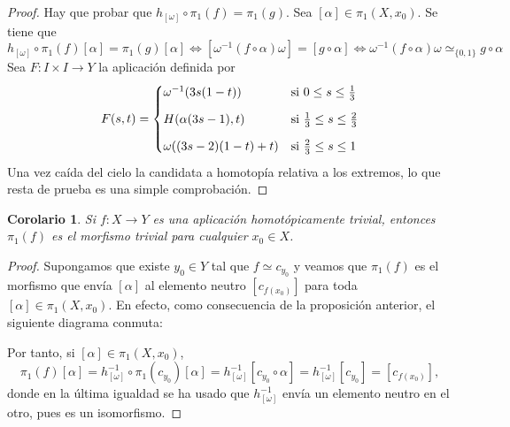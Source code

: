 \documentclass[11pt]{report}
\newtheorem{corollary}{Corolario}[chapter]
\theoremstyle{definition}
\theoremstyle{definition}
\theoremstyle{remark}
\begin{document}
\begin{proof}
Hay que probar que $h_{[\omega]} \circ \pi_1(f) = \pi_1(g)$. Sea $[\alpha] \in \pi_1(X,x_0)$. Se tiene que
\[h_{[\omega]} \circ \pi_1(f)[\alpha] = \pi_1(g)[\alpha] \iff [\omega^{-1}(f \circ \alpha)\omega] = [g \circ \alpha] \iff \omega^{-1}(f \circ \alpha)\omega \simeq_{\{0,1\}} g \circ \alpha\]
Sea $F \colon I \times I \to Y$ la aplicación definida por
\[F(s,t) = \begin{cases}
    \omega^{-1}(3s(1-t)) & $si$ \ 0 \leq s \leq \frac{1}{3} \\[7.5pt]
    H(\alpha(3s-1),t) & $si$ \ \frac{1}{3} \leq s \leq \frac{2}{3} \\[7.5pt]
    \omega((3s-2)(1-t)+t) & $si$ \ \frac{2}{3} \leq s \leq 1
\end{cases}\]
Una vez caída del cielo la candidata a homotopía relativa a los extremos, lo que resta de prueba es una simple comprobación.
\end{proof}

\begin{corollary}
Si $f \colon X \to Y$ es una aplicación homotópicamente trivial, entonces $\pi_1(f)$ es el morfismo trivial para cualquier $x_0 \in X$.
\end{corollary}

\begin{proof}
Supongamos que existe $y_0 \in Y$ tal que $f \simeq c_{y_0}$ y veamos que $\pi_1(f)$ es el morfismo que envía $[\alpha]$ al elemento neutro $[c_{f(x_0)}]$ para toda $[\alpha] \in \pi_1(X,x_0)$. En efecto, como consecuencia de la proposición anterior, el siguiente diagrama conmuta:
\begin{center}
\end{center}
Por tanto, si $[\alpha] \in \pi_1(X,x_0)$, 
\[\pi_1(f)[\alpha] = h^{-1}_{[\omega]} \circ \pi_1(c_{y_0})[\alpha] =h^{-1}_{[\omega]} [c_{y_0} \circ \alpha] = h^{-1}_{[\omega]} [c_{y_0}] =[c_{f(x_0)}],\]
donde en la última igualdad se ha usado que $h^{-1}_{[\omega]}$ envía un elemento neutro en el otro, pues es un isomorfismo.
\end{proof}
\end{document}
